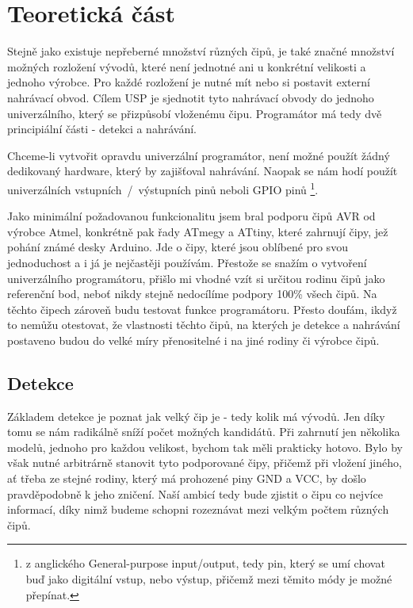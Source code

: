 \documentclass[11pt,a4paper,twoside,openright]{report}
\begin{document}


\setcounter{tocdepth}{2}
\tableofcontents

\chapter{Teoretická část}
\pagestyle{fancy}

Stejně jako existuje nepřeberné množství různých čipů, je také značné množství možných rozložení vývodů, které není jednotné ani u konkrétní velikosti a jednoho výrobce. Pro každé rozložení je nutné mít nebo si postavit externí nahrávací obvod. Cílem USP je sjednotit tyto nahrávací obvody do jednoho univerzálního, který se přizpůsobí vloženému čipu. Programátor má tedy dvě principiální části - detekci a nahrávání. 

Chceme-li vytvořit opravdu univerzální programátor, není možné použít žádný dedikovaný hardware, který by zajišťoval nahrávání. Naopak se nám hodí použít univerzálních vstupních~/~výstupních pinů neboli GPIO pinů \footnote{z anglického General-purpose input/output, tedy pin, který se umí chovat buď jako digitální vstup, nebo výstup, přičemž mezi těmito módy je možné přepínat.}.

Jako minimální požadovanou funkcionalitu jsem bral podporu čipů AVR od výrobce Atmel, konkrétně pak řady ATmegy a ATtiny, které zahrnují čipy, jež pohání známé desky Arduino. Jde o čipy, které jsou oblíbené pro svou jednoduchost a i já je nejčastěji používám. Přestože se snažím o vytvoření univerzálního programátoru, přišlo mi vhodné vzít si určitou rodinu čipů jako referenční bod, neboť nikdy stejně nedocílíme podpory 100\% všech čipů. Na těchto čipech zároveň budu testovat funkce programátoru. Přesto doufám, ikdyž to nemůžu otestovat, že vlastnosti těchto čipů, na kterých je detekce a nahrávání postaveno budou do velké míry přenositelné i na jiné rodiny či výrobce čipů.

\section{Detekce}

Základem detekce je poznat jak velký čip je - tedy kolik má vývodů. Jen díky tomu se nám radikálně sníží počet možných kandidátů. Při zahrnutí jen několika modelů, jednoho pro každou velikost, bychom tak měli prakticky hotovo. Bylo by však nutné arbitrárně stanovit tyto podporované čipy, přičemž při vložení jiného, ať třeba ze stejné rodiny, který má prohozené piny GND a VCC, by došlo pravděpodobně k jeho zničení. Naší ambicí tedy bude zjistit o čipu co nejvíce informací, díky nimž budeme schopni rozeznávat mezi velkým počtem různých čipů.
\end{document}
